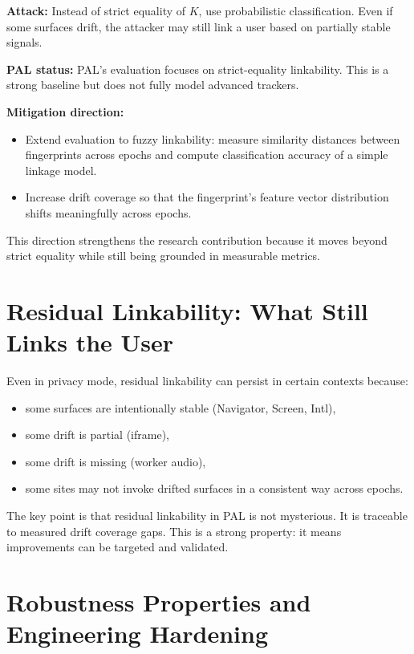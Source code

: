 \documentclass[11pt]{report}
\begin{document}
\textbf{Attack:} Instead of strict equality of $K$, use probabilistic classification. Even if some surfaces drift, the attacker may still link a user based on partially stable signals.

\textbf{PAL status:} PAL’s evaluation focuses on strict-equality linkability. This is a strong baseline but does not fully model advanced trackers.

\textbf{Mitigation direction:}
\begin{itemize}
    \item Extend evaluation to fuzzy linkability: measure similarity distances between fingerprints across epochs and compute classification accuracy of a simple linkage model.
    \item Increase drift coverage so that the fingerprint’s feature vector distribution shifts meaningfully across epochs.
\end{itemize}

This direction strengthens the research contribution because it moves beyond strict equality while still being grounded in measurable metrics.

\section{Residual Linkability: What Still Links the User}

Even in privacy mode, residual linkability can persist in certain contexts because:

\begin{itemize}
    \item some surfaces are intentionally stable (Navigator, Screen, Intl),
    \item some drift is partial (iframe),
    \item some drift is missing (worker audio),
    \item some sites may not invoke drifted surfaces in a consistent way across epochs.
\end{itemize}

The key point is that residual linkability in PAL is not mysterious. It is traceable to measured drift coverage gaps. This is a strong property: it means improvements can be targeted and validated.

\section{Robustness Properties and Engineering Hardening}
\end{document}

